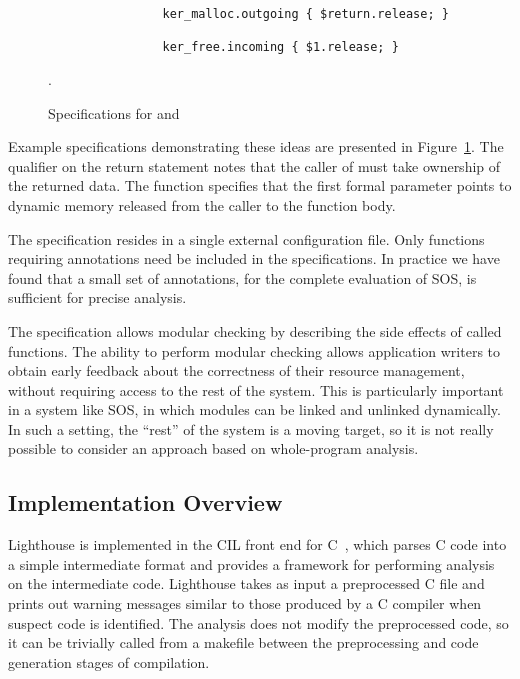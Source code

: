 \begin{figure}[tp]
\centering
\lstset{numbers=none, language=C}
\begin{lstlisting}
                ker_malloc.outgoing { $return.release; }

                ker_free.incoming { $1.release; }
\end{lstlisting}
\caption{\label{fig:spec}Specifications for  and
}.
\end{figure}



Example specifications demonstrating these ideas are presented in
Figure~\ref{fig:spec}.
%
The  qualifier on the  return statement notes
that the caller of  must take ownership of the returned
data.
%
The  function specifies that the  first formal
parameter points to dynamic memory released from the caller to the function
body.



The specification resides in a single external configuration file.
%
Only functions requiring annotations need be included in the specifications.
%
In practice we have found that a small set of annotations, \numannote for
the complete evaluation of SOS, is sufficient for precise analysis. 



The specification allows modular checking by describing the side effects of
called functions.
%
The ability to perform modular checking allows application writers to obtain
early feedback about the correctness of their resource management, without
requiring access to the rest of the system.  
%
This is particularly important in a system like SOS, in which modules can be
linked and unlinked dynamically.  
%
In such a setting, the ``rest'' of the system is a moving target, so it is not
really possible to consider an approach based on whole-program analysis.



\subsection{Implementation Overview}



Lighthouse is implemented in the CIL front end for C~\cite{CIL}, which
parses C code into a simple intermediate format and provides a framework for
performing analysis on the intermediate code. 
%
Lighthouse takes as input a preprocessed C file and prints out warning
messages similar to those produced by a C compiler when suspect code is
identified.
%
The analysis does not modify the preprocessed code, so it can be trivially
called from a makefile between the preprocessing and code generation stages
of compilation.



